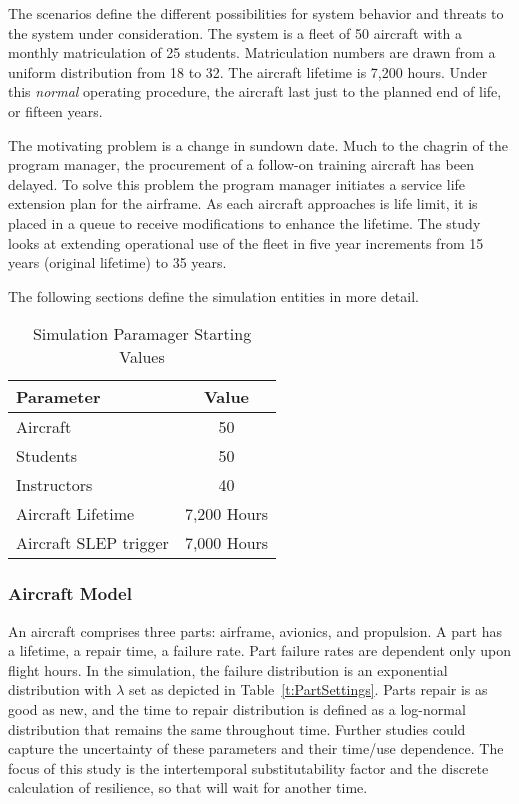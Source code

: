 \documentclass[preprint,12pt]{elsarticle}
\begin{document}
The scenarios define the different possibilities for system behavior
and threats to the system under consideration. The system is a fleet
of 50 aircraft with a monthly matriculation of
25 students. Matriculation numbers are drawn from a uniform
distribution from 18 to 32.  The aircraft lifetime is 7,200 hours. Under this
\emph{normal} operating procedure, the  
aircraft last just to the planned end of life, or fifteen years.

The motivating problem is a change in sundown date. Much to the
chagrin of the program manager, the procurement of a follow-on
training aircraft has been delayed. To solve this problem the program manager
initiates a service life extension plan for the airframe. As each
aircraft approaches is life limit, it is placed in a queue to receive
modifications to enhance the lifetime. The study looks at extending
operational use of the fleet in five year increments from 15 years
(original lifetime) to 35 years.

The following sections define the simulation entities in more detail.

\begin{table}[h]
    \centering
    \begin{tabular}{l c }
      \hline
      \hline
      \textbf{Parameter} & \textbf{Value} \\
      \hline
      Aircraft & 50 \\
      Students & 50 \\
      Instructors & 40 \\
      Aircraft Lifetime & 7,200 Hours \\
      Aircraft SLEP trigger & 7,000 Hours \\
      \hline
    \end{tabular}
    \caption{Simulation Paramager Starting Values }
  \label{t:StartingValues}
\end{table}

\subsubsection{Aircraft Model}
An aircraft comprises three parts: airframe, avionics, and
propulsion. A part has a lifetime, a repair time, a failure rate. Part
failure rates are dependent only upon flight hours. In the simulation,
the failure distribution is an exponential distribution with $\lambda$
set as depicted in Table~\ref{t:PartSettings}. Parts repair is
as good as new, and the time to repair distribution is defined as a
log-normal distribution that remains the same throughout time. Further
studies could capture the uncertainty of these parameters and their
time/use dependence. The focus of this study is the intertemporal
substitutability factor and the discrete calculation of resilience, so
that will wait for another time.
\end{document}
